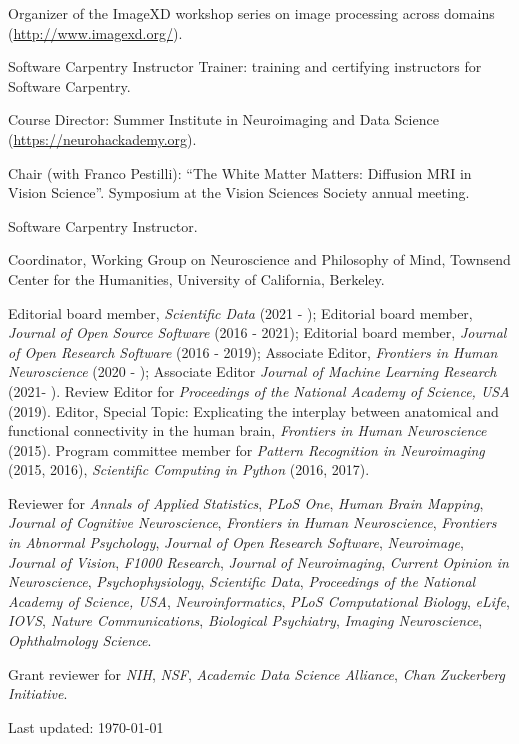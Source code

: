 \documentclass[11pt,fullpage]{article}
\newcommand{\years}[1]{\marginnote{\scriptsize #1}} %
\begin{document}
\years{2016 -- 2017} Organizer of the ImageXD workshop series on image processing across domains (\url{http://www.imagexd.org/}).

\years{2016 -- } Software Carpentry Instructor Trainer: training and certifying instructors for Software Carpentry.

\years{2016 --} Course Director: Summer Institute in Neuroimaging and Data Science (\url{https://neurohackademy.org}).

\years{2014} Chair (with Franco Pestilli): ``The White Matter Matters: Diffusion MRI in Vision Science''. Symposium at the Vision Sciences Society annual meeting.

\years{2012 --}  Software Carpentry Instructor.

\years{2007 - 2008} Coordinator, Working Group on Neuroscience and Philosophy of Mind, Townsend Center for the Humanities, University of California, Berkeley.

\vspace{4pt}

Editorial board member, \emph{Scientific Data} (2021 - ); Editorial board member, \emph{Journal of Open Source Software} (2016 - 2021);  Editorial board member, \emph{Journal of Open Research Software} (2016 - 2019); Associate Editor, \emph{Frontiers in Human Neuroscience} (2020 - ); Associate Editor \emph{Journal of Machine Learning Research} (2021- ). Review Editor for \emph{Proceedings of the National Academy of Science, USA} (2019). Editor, Special Topic: Explicating the interplay between anatomical and functional connectivity in the human brain, \emph{Frontiers in Human Neuroscience} (2015). Program committee member for \emph{Pattern Recognition in Neuroimaging} (2015, 2016), \emph{Scientific Computing in Python} (2016, 2017).

\vspace{4pt}

Reviewer for \emph{Annals of Applied Statistics}, \emph{PLoS One}, \emph{Human Brain Mapping}, \emph{Journal of Cognitive Neuroscience}, \emph{Frontiers in Human Neuroscience}, \emph{Frontiers in Abnormal Psychology}, \emph{Journal of Open Research Software}, \emph{Neuroimage}, \emph{Journal of Vision}, \emph{F1000 Research}, \emph{Journal of Neuroimaging}, \emph{Current Opinion in Neuroscience}, \emph{Psychophysiology}, \emph{Scientific Data}, \emph{Proceedings of the National Academy of Science, USA}, \emph{Neuroinformatics}, \emph{PLoS Computational Biology}, \emph{eLife}, \emph{IOVS}, \emph{Nature Communications}, \emph{Biological Psychiatry}, \emph{Imaging Neuroscience}, \emph{Ophthalmology Science}.

\vspace{4pt}

Grant reviewer for \emph{NIH}, \emph{NSF}, \emph{Academic Data Science Alliance}, \emph{Chan Zuckerberg Initiative}.


\bigskip
\begin{center}
  \begin{footnotesize}
    Last updated: \today
  \end{footnotesize}
\end{center}

\end{document}
